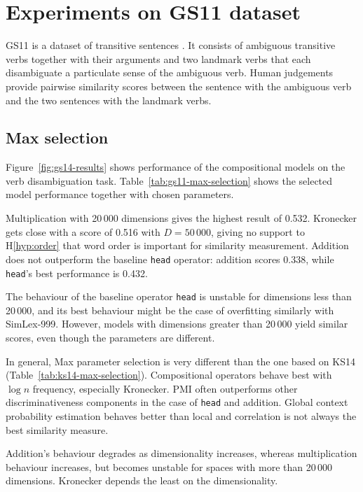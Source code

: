 \section{Experiments on GS11 dataset}
\label{sec:gs11}

GS11 is a dataset of transitive sentences \cite{Grefenstette:2011:ESC:2145432.2145580,Grefenstette:2011:ETV:2140490.2140497}. It consists of ambiguous transitive verbs together with their arguments and two landmark verbs that each disambiguate a particulate sense of the ambiguous verb. Human judgements provide pairwise similarity scores between the sentence with the ambiguous verb and the two sentences with the landmark verbs.

\subsection{Max selection}
\label{sec:max-selection-gs11}



Figure~\ref{fig:gs14-results} shows performance of the compositional models on the verb disambiguation task. Table~\ref{tab:gs11-max-selection} shows the selected model performance together with chosen parameters.

Multiplication with 20\,000 dimensions gives the highest result of 0.532. Kronecker gets close with a score of 0.516 with $D = 50\,000$, giving no support to H\ref{hyp:order} that word order is important for similarity measurement. Addition does not outperform the baseline \texttt{head} operator: addition scores 0.338, while \texttt{head}'s best performance is 0.432.

The behaviour of the baseline operator \texttt{head} is unstable for dimensions less than 20\,000, and its best behaviour might be the case of overfitting similarly with SimLex-999. However, models with dimensions greater than 20\,000 yield similar scores, even though the parameters are different.

In general, Max parameter selection is very different than the one based on KS14 (Table~\ref{tab:ks14-max-selection}). Compositional operators behave best with $\log n$ frequency, especially Kronecker. PMI often outperforms other discriminativeness components in the case of \texttt{head} and addition. Global context probability estimation behaves better than local and correlation is not always the best similarity measure.

Addition's behaviour degrades as dimensionality increases, whereas multiplication behaviour increases, but becomes unstable for spaces with more than 20\,000 dimensions. Kronecker depends the least on the dimensionality.

